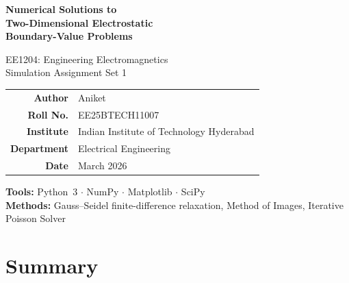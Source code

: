 \documentclass[11pt,a4paper]{article}
\begin{document}
\begin{titlepage}
\centering
\vspace*{3cm}
{\Huge\bfseries Numerical Solutions to\\[4mm]Two-Dimensional Electrostatic\\[4mm]Boundary-Value Problems\par}
\vspace{1.5cm}
{\Large EE1204: Engineering Electromagnetics\\[3mm]Simulation Assignment Set 1\par}
\vspace{2cm}
\begin{tabular}{rl}
\textbf{Author}      & Aniket \\
\textbf{Roll No.}    & EE25BTECH11007 \\
\textbf{Institute}   & Indian Institute of Technology Hyderabad \\
\textbf{Department}  & Electrical Engineering \\
\textbf{Date}        & March 2026 \\
\end{tabular}
\vspace{1.5cm}

\textbf{Tools:} Python~3 $\cdot$ NumPy $\cdot$ Matplotlib $\cdot$ SciPy\\[3mm]
\textbf{Methods:} Gauss--Seidel finite-difference relaxation, Method of Images, Iterative Poisson Solver\\[8mm]

\noindent{}
\end{titlepage}

\tableofcontents
\newpage

\section*{Summary}
\end{document}
